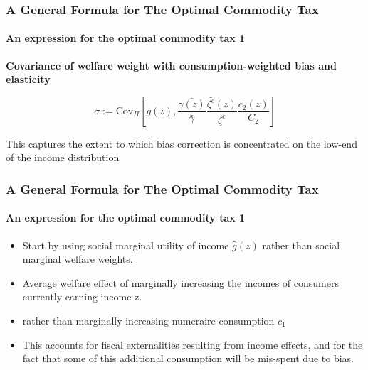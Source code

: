 \documentclass{beamer}
\newcommand{\Cov}{\mathrm{Cov}}
\begin{document}
\begin{frame}
\frametitle{A General Formula for The Optimal Commodity Tax}
\framesubtitle{An expression for the optimal commodity tax 1}

\textbf{ Covariance of welfare weight with consumption-weighted bias and elasticity}

$$ \sigma := \Cov_H \left[ g(z), \frac{\bar{\gamma(z)}}{\bar{\gamma}} \frac{\bar{\zeta^c}(z)}{\bar{\zeta^c}}
\frac{\bar{c}_2(z)}{C_2 }  \right] $$

This captures the extent to which bias correction is concentrated on the low-end of the income distribution

\end{frame}



\begin{frame}
\frametitle{A General Formula for The Optimal Commodity Tax}
\framesubtitle{An expression for the optimal commodity tax 1}

\begin{itemize}
	\item Start by using social marginal utility of income  $\hat{g}(z)$ rather than social marginal welfare weights.
	\item Average welfare effect of marginally increasing the incomes of consumers currently earning income
	z.
	\item rather than marginally increasing numeraire consumption $c_1$
	\item This accounts for fiscal externalities resulting from income effects, and for the fact that some of this additional consumption will be mis-spent due to bias.
\end{itemize} 

\end{frame}
\end{document}
